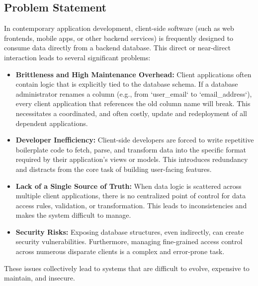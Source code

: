 \documentclass[12pt, a4paper]{report}
\begin{document}
\subsection{Problem Statement}
In contemporary application development, client-side software (such as web frontends, mobile apps, or other backend services) is frequently designed to consume data directly from a backend database. This direct or near-direct interaction leads to several significant problems:
\begin{itemize}
    \item \textbf{Brittleness and High Maintenance Overhead:} Client applications often contain logic that is explicitly tied to the database schema. If a database administrator renames a column (e.g., from `user_email` to `email_address`), every client application that references the old column name will break. This necessitates a coordinated, and often costly, update and redeployment of all dependent applications.
    \item \textbf{Developer Inefficiency:} Client-side developers are forced to write repetitive boilerplate code to fetch, parse, and transform data into the specific format required by their application's views or models. This introduces redundancy and distracts from the core task of building user-facing features.
    \item \textbf{Lack of a Single Source of Truth:} When data logic is scattered across multiple client applications, there is no centralized point of control for data access rules, validation, or transformation. This leads to inconsistencies and makes the system difficult to manage.
    \item \textbf{Security Risks:} Exposing database structures, even indirectly, can create security vulnerabilities. Furthermore, managing fine-grained access control across numerous disparate clients is a complex and error-prone task.
\end{itemize}
These issues collectively lead to systems that are difficult to evolve, expensive to maintain, and insecure.
\end{document}
